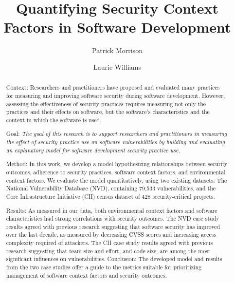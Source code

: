\documentclass[sigconf,anonymous]{acmart}
\begin{document}

\title{Quantifying Security Context Factors in Software Development}


\author{Patrick Morrison}


\author{Laurie Williams}


	
\begin{abstract}
\label{sec:abstract}
Context: Researchers and practitioners have proposed and evaluated many practices for measuring and improving software security during software development. However, assessing the effectiveness of security practices requires measuring not only the practices and their effects on software, but the software's characteristics and the context in which the software is used. 

Goal:  \textit{The goal of this research is to support researchers and practitioners in measuring the effect of security practice use on software vulnerabilities by building and evaluating an explanatory model for software development security practice use.} 

Method: In this work, we develop a model hypothesizing relationships between security outcomes, adherence to security practices, software context factors, and environmental context factors.  We evaluate the model quantitatively, using two existing datasets: The National Vulnerability Database (NVD), containing 79,533 vulnerabilities, and the Core Infrastructure Initiative (CII) census dataset of 428 security-critical projects.  

Results: As measured in our data, both environmental context factors and software characteristics had strong correlations with security outcomes. The NVD case study results agreed with previous research suggesting that software security has improved over the last decade, as measured by decreasing CVSS scores and increasing access complexity required of attackers. The CII case study results agreed with previous research suggesting that team size and effort, and code size, are among the most significant influences on vulnerabilities. 
Conclusion: The developed model and results from the two case studies offer a guide to the metrics suitable for prioritizing management of software context factors and security outcomes. 


\end{abstract}
\end{document}
